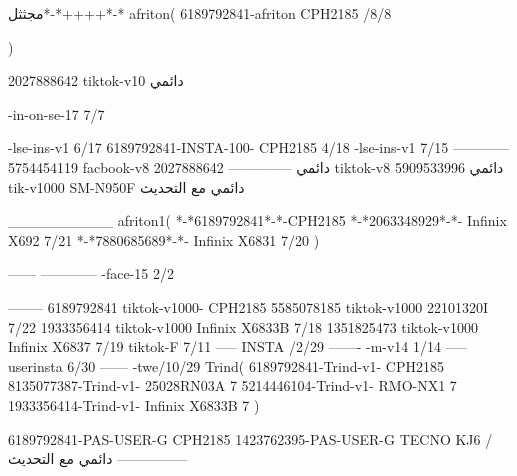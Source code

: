 مجثثل*-*++++*-*
afriton(
6189792841-afriton CPH2185  /8/8

)

2027888642 tiktok-v10
دائمي

-in-on-se-17 7/7

-lse-ins-v1 6/17
6189792841-INSTA-100- CPH2185 4/18
-lse-ins-v1 7/15
------------
5754454119 facbook-v8
دائمي
--------------
2027888642 tiktok-v8
دائمي
5909533996 tik-v1000  SM-N950F
دائمي مع التحديث

__________
afriton1(
*-*6189792841*-*-CPH2185
*-*2063348929*-*-  Infinix X692  7/21
*-*7880685689*-*-   Infinix X6831  7/20
)


------
------------
-face-15 2/2

--------
6189792841 tiktok-v1000- CPH2185 
5585078185 tiktok-v1000 22101320I  7/22
1933356414 tiktok-v1000 Infinix X6833B  7/18
1351825473 tiktok-v1000 Infinix X6837  7/19
 tiktok-F   7/11
-----
 INSTA /2/29
-------
-m-v14 1/14
-----
userinsta 6/30
------
-twe/10/29
Trind(
6189792841-Trind-v1- CPH2185 
8135077387-Trind-v1- 25028RN03A 7
5214446104-Trind-v1- RMO-NX1 7
1933356414-Trind-v1- Infinix X6833B 7
)


6189792841-PAS-USER-G CPH2185 
1423762395-PAS-USER-G TECNO KJ6  /دائمي مع التحديث
    ---------------
